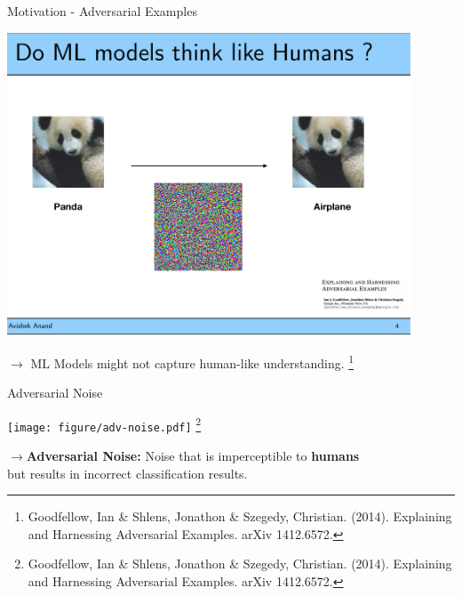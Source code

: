 \documentclass[11pt,compress,t,notes=noshow, xcolor=table]{beamer}
\begin{document}
\begin{vbframe}{Motivation - Adversarial Examples}
    
    \begin{center}
    \includegraphics[width=0.9\textwidth]{figure/panda-airplane.pdf}
    \end{center}
	\bigskip
	
	$\rightarrow$ ML Models might not capture human-like understanding.        
    \footnote[frame]{Goodfellow, Ian \& Shlens, Jonathon \& Szegedy, Christian. (2014). Explaining and Harnessing Adversarial Examples. arXiv 1412.6572.}
\end{vbframe}

	
\begin{vbframe}{Adversarial Noise}
    \begin{center}
    \texttt{[image: figure/adv-noise.pdf]}    \footnote[frame]{Goodfellow, Ian \& Shlens, Jonathon \& Szegedy, Christian. (2014). Explaining and Harnessing Adversarial Examples. arXiv 1412.6572.}
	\end{center}
	\normalsize
	\bigskip
	$\rightarrow$\textbf{Adversarial Noise:} Noise that is imperceptible to \textbf{humans}\\ but results in incorrect classification results.
\end{vbframe}

\endlecture
\end{document}
